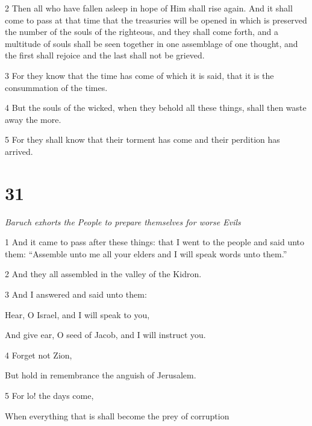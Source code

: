 \par 2 Then all who have fallen asleep in hope of Him shall rise again. And it shall come to pass at that time that the treasuries will be opened in which is preserved the number of the souls of the righteous, and they shall come forth, and a multitude of souls shall be seen together in one assemblage of one thought, and the first shall rejoice and the last shall not be grieved. 

\par 3 For they know that the time has come of which it is said, that it is the consummation of the times. 

\par 4 But the souls of the wicked, when they behold all these things, shall then waste away the more. 

\par 5 For they shall know that their torment has come and their perdition has arrived.

\chapter{31}

\par \textit{Baruch exhorts the People to prepare themselves for worse Evils}

\par 1 And it came to pass after these things: that I went to the people and said unto them: “Assemble unto me all your elders and I will speak words unto them.”

\par 2 And they all assembled in the valley of the Kidron. 

\par 3 And I answered and said unto them:

\par Hear, O Israel, and I will speak to you,

\par And give ear, O seed of Jacob, and I will instruct you.

\par 4 Forget not Zion,

\par But hold in remembrance the anguish of Jerusalem.

\par 5 For lo! the days come,

\par When everything that is shall become the prey of corruption

